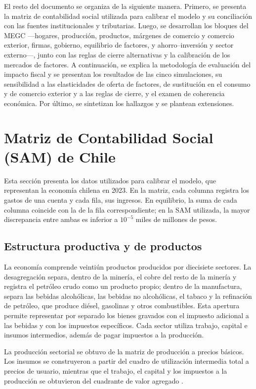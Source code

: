 \documentclass[11pt]{article}
\begin{document}
El resto del documento se organiza de la siguiente manera. Primero, se presenta la matriz de contabilidad social utilizada para calibrar el modelo y su conciliación con las fuentes institucionales y tributarias. Luego, se desarrollan los bloques del MEGC ---hogares, producción, productos, márgenes de comercio y comercio exterior, firmas, gobierno, equilibrio de factores, y ahorro--inversión y sector externo---, junto con las reglas de cierre alternativas y la calibración de los mercados de factores. A continuación, se explica la metodología de evaluación del impacto fiscal y se presentan los resultados de las cinco simulaciones, su sensibilidad a las elasticidades de oferta de factores, de sustitución en el consumo y de comercio exterior y a las reglas de cierre, y el examen de coherencia económica. Por último, se sintetizan los hallazgos y se plantean extensiones.

\section{Matriz de Contabilidad Social (SAM) de Chile}

Esta sección presenta los datos utilizados para calibrar el modelo, que representan la economía chilena en 2023. En la matriz, cada columna registra los gastos de una cuenta y cada fila, sus ingresos. En equilibrio, la suma de cada columna coincide con la de la fila correspondiente; en la SAM utilizada, la mayor discrepancia entre ambas es inferior a $10^{-5}$ miles de millones de pesos.

\subsection{Estructura productiva y de productos}

La economía comprende veintiún productos producidos por diecisiete sectores. La desagregación separa, dentro de la minería, el cobre del resto de la minería y registra el petróleo crudo como un producto propio; dentro de la manufactura, separa las bebidas alcohólicas, las bebidas no alcohólicas, el tabaco y la refinación de petróleo, que produce diésel, gasolinas y otros combustibles. Esta apertura permite representar por separado los bienes gravados con el impuesto adicional a las bebidas y con los impuestos específicos. Cada sector utiliza trabajo, capital e insumos intermedios, además de pagar impuestos a la producción.

La producción sectorial se obtuvo de la matriz de producción a precios básicos. Los insumos se construyeron a partir del cuadro de utilización intermedia total a precios de usuario, mientras que el trabajo, el capital y los impuestos a la producción se obtuvieron del cuadrante de valor agregado \cite{bcch_cou_2023}.
\end{document}

